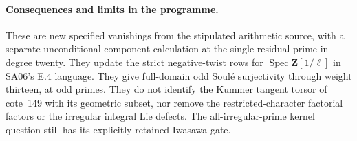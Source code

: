 \paragraph{Consequences and limits in the programme.}
These are new specified vanishings from the stipulated arithmetic
source, with a separate unconditional component calculation at the
single residual prime in degree twenty. They update the strict
negative-twist rows for $\operatorname{Spec}\mathbf Z[1/\ell]$ in
SA06's E.4 language. They give full-domain odd Soul\'e surjectivity
through weight thirteen, at odd primes. They do not identify the
Kummer tangent torsor of cote~149 with its geometric subset, nor
remove the restricted-character factorial factors or the irregular
integral Lie defects. The all-irregular-prime kernel question still
has its explicitly retained Iwasawa gate.
